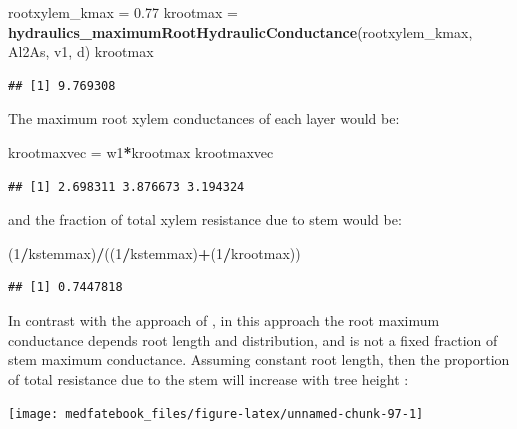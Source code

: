 \documentclass[]{book}
\newenvironment{Shaded}{\begin{snugshade}}{\end{snugshade}}
\newcommand{\KeywordTok}[1]{\textcolor[rgb]{0.13,0.29,0.53}{\textbf{#1}}}
\newcommand{\DecValTok}[1]{\textcolor[rgb]{0.00,0.00,0.81}{#1}}
\newcommand{\FloatTok}[1]{\textcolor[rgb]{0.00,0.00,0.81}{#1}}
\newcommand{\StringTok}[1]{\textcolor[rgb]{0.31,0.60,0.02}{#1}}
\newcommand{\OperatorTok}[1]{\textcolor[rgb]{0.81,0.36,0.00}{\textbf{#1}}}
\newcommand{\NormalTok}[1]{#1}
\begin{document}
\begin{Shaded}
\begin{Highlighting}[]
\NormalTok{rootxylem_kmax =}\StringTok{ }\FloatTok{0.77}
\NormalTok{krootmax =}\StringTok{ }\KeywordTok{hydraulics_maximumRootHydraulicConductance}\NormalTok{(rootxylem_kmax, Al2As, }
\NormalTok{                                                      v1, d)}
\NormalTok{krootmax}
\end{Highlighting}
\end{Shaded}

\begin{verbatim}
## [1] 9.769308
\end{verbatim}

The maximum root xylem conductances of each layer would be:

\begin{Shaded}
\begin{Highlighting}[]
\NormalTok{krootmaxvec =}\StringTok{ }\NormalTok{w1}\OperatorTok{*}\NormalTok{krootmax}
\NormalTok{krootmaxvec}
\end{Highlighting}
\end{Shaded}

\begin{verbatim}
## [1] 2.698311 3.876673 3.194324
\end{verbatim}

and the fraction of total xylem resistance due to stem would be:

\begin{Shaded}
\begin{Highlighting}[]
\NormalTok{(}\DecValTok{1}\OperatorTok{/}\NormalTok{kstemmax)}\OperatorTok{/}\NormalTok{((}\DecValTok{1}\OperatorTok{/}\NormalTok{kstemmax)}\OperatorTok{+}\NormalTok{(}\DecValTok{1}\OperatorTok{/}\NormalTok{krootmax))}
\end{Highlighting}
\end{Shaded}

\begin{verbatim}
## [1] 0.7447818
\end{verbatim}

In contrast with the approach of \citet{Christoffersen2016}, in this approach the root maximum conductance depends root length and distribution, and is not a fixed fraction of stem maximum conductance. Assuming constant root length, then the proportion of total resistance due to the stem will increase with tree height \citep{Magnani2000}:

\begin{center}\texttt{[image: medfatebook\_files/figure-latex/unnamed-chunk-97-1]} \end{center}
\end{document}
